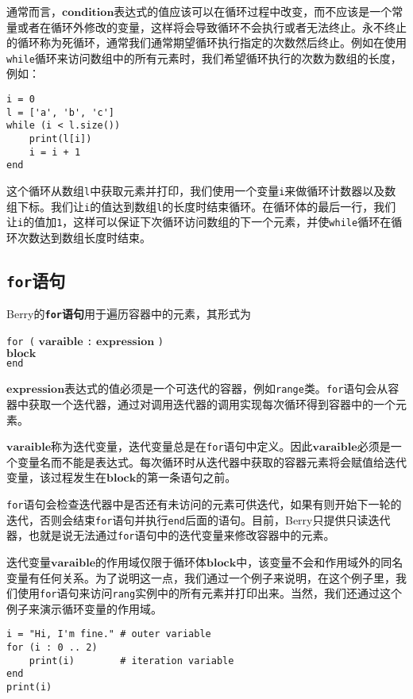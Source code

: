 通常而言，$\bm{condition}$表达式的值应该可以在循环过程中改变，而不应该是一个常量或者在循环外修改的变量，这样将会导致循环不会执行或者无法终止。永不终止的循环称为死循环，通常我们通常期望循环执行指定的次数然后终止。例如在使用\texttt{while}循环来访问数组中的所有元素时，我们希望循环执行的次数为数组的长度，例如：
\begin{lstlisting}[language=berry, numbers=none]
i = 0
l = ['a', 'b', 'c']
while (i < l.size())
    print(l[i])
    i = i + 1
end
\end{lstlisting}
这个循环从数组\texttt{l}中获取元素并打印，我们使用一个变量\texttt{i}来做循环计数器以及数组下标。我们让\texttt{i}的值达到数组\texttt{l}的长度时结束循环。在循环体的最后一行，我们让\texttt{i}的值加\texttt{1}，这样可以保证下次循环访问数组的下一个元素，并使\texttt{while}循环在循环次数达到数组长度时结束。

\subsection{\texttt{for}语句}

Berry的\textbf{\texttt{for}语句}用于遍历容器中的元素，其形式为
\begin{algorithm}
    \texttt{for (} $\bm{varaible}$ \texttt{:} $\bm{expression}$ \texttt{)} \\
        \qquad $\bm{block}$ \\
    \texttt{end}
\end{algorithm}\vspace{-0.6em}

$\bm{expression}$表达式的值必须是一个可迭代的容器，例如\texttt{range}类。\texttt{for}语句会从容器中获取一个迭代器，通过对调用迭代器的调用实现每次循环得到容器中的一个元素。

$\bm{varaible}$称为迭代变量，迭代变量总是在\texttt{for}语句中定义。因此$\bm{varaible}$必须是一个变量名而不能是表达式。每次循环时从迭代器中获取的容器元素将会赋值给迭代变量，该过程发生在$\bm{block}$的第一条语句之前。

\texttt{for}语句会检查迭代器中是否还有未访问的元素可供迭代，如果有则开始下一轮的迭代，否则会结束\texttt{for}语句并执行\texttt{end}后面的语句。目前，Berry只提供只读迭代器，也就是说无法通过\texttt{for}语句中的迭代变量来修改容器中的元素。

迭代变量$\bm{varaible}$的作用域仅限于循环体$\bm{block}$中，该变量不会和作用域外的同名变量有任何关系。为了说明这一点，我们通过一个例子来说明，在这个例子里，我们使用\texttt{for}语句来访问\texttt{rang}实例中的所有元素并打印出来。当然，我们还通过这个例子来演示循环变量的作用域。
\begin{lstlisting}[language=berry]
i = "Hi, I'm fine." # outer variable
for (i : 0 .. 2)
    print(i)        # iteration variable
end
print(i)
\end{lstlisting}

